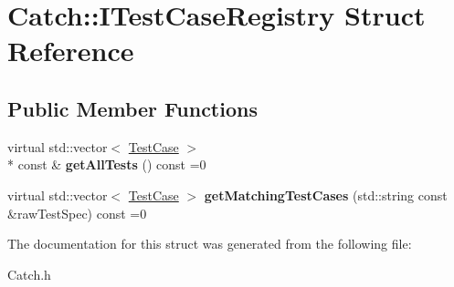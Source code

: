 \hypertarget{struct_catch_1_1_i_test_case_registry}{\section{Catch\-:\-:I\-Test\-Case\-Registry Struct Reference}
\label{struct_catch_1_1_i_test_case_registry}
}
\subsection*{Public Member Functions}
\begin{DoxyCompactItemize}
\item 
\hypertarget{struct_catch_1_1_i_test_case_registry_ad6e4d4a621655123f73ae98cfeda063d}{virtual std\-::vector$<$ \hyperlink{class_catch_1_1_test_case}{Test\-Case} $>$\\*
 const \& {\bfseries get\-All\-Tests} () const =0}\label{struct_catch_1_1_i_test_case_registry_ad6e4d4a621655123f73ae98cfeda063d}

\item 
\hypertarget{struct_catch_1_1_i_test_case_registry_ac112a15cfde63b4a6aedab22934d0ce5}{virtual std\-::vector$<$ \hyperlink{class_catch_1_1_test_case}{Test\-Case} $>$ {\bfseries get\-Matching\-Test\-Cases} (std\-::string const \&raw\-Test\-Spec) const =0}\label{struct_catch_1_1_i_test_case_registry_ac112a15cfde63b4a6aedab22934d0ce5}

\end{DoxyCompactItemize}


The documentation for this struct was generated from the following file\-:\begin{DoxyCompactItemize}
\item 
Catch.\-h\end{DoxyCompactItemize}
